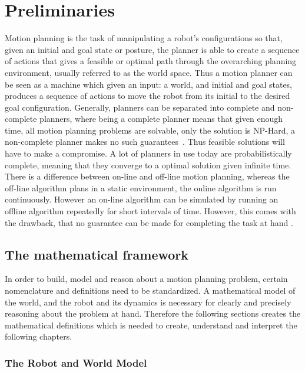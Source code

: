 \chapter{Preliminaries}
\label{chp:preliminaries}

Motion planning is the task of manipulating a robot's configurations so that,
given an initial and goal state or posture, the planner is able to create a
sequence of actions that gives a feasible or optimal path through the
overarching planning environment, usually referred to as the world space. Thus a
motion planner can be seen as a machine which given an input: a world, and
initial and goal states, produces a sequence of actions to move the robot from
its initial to the desired goal configuration. Generally, planners can be
separated into complete and non-complete planners, where being a complete
planner means that given enough time, all motion planning problems are solvable,
only the solution is NP-Hard, a non-complete planner makes no such
guarantees~\cite{Lav06}. Thus feasible solutions will have to make a compromise.
A lot of planners in use today are probabilistically complete, meaning that they
converge to a optimal solution given infinite time. There is a difference
between on-line and off-line motion planning, whereas the off-line algorithm
plans in a static environment, the online algorithm is run continuously. However
an on-line algorithm can be simulated by running an offline algorithm repeatedly
for short intervals of time. However, this comes with the drawback, that no
guarantee can be made for completing the task at hand \cite{Lav06}.

\section{The mathematical framework}

In order to build, model and reason about a motion planning problem, certain
nomenclature and definitions need to be standardized. A mathematical model of
the world, and the robot and its dynamics is necessary for clearly and precisely
reasoning about the problem at hand. Therefore the following sections creates
the mathematical definitions which is needed to create, understand and interpret
the following chapters.

\subsection{The Robot and World Model}

